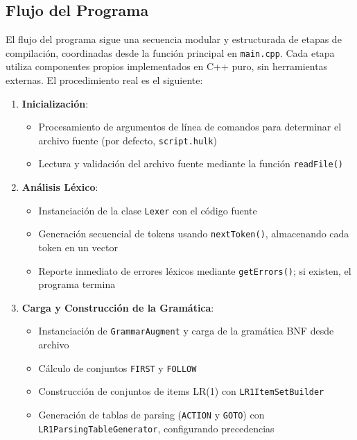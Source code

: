 \documentclass[11pt, a4paper, twoside]{article} %
\begin{document}
\subsection{Flujo del Programa}
El flujo del programa sigue una secuencia modular y estructurada de etapas de compilación, coordinadas desde la función principal en \texttt{main.cpp}. Cada etapa utiliza componentes propios implementados en C++ puro, sin herramientas externas. El procedimiento real es el siguiente:

\begin{enumerate}
    \item \textbf{Inicialización}:
    \begin{itemize}
        \item Procesamiento de argumentos de línea de comandos para determinar el archivo fuente (por defecto, \texttt{script.hulk})
        \item Lectura y validación del archivo fuente mediante la función \texttt{readFile()}
    \end{itemize}

    \item \textbf{Análisis Léxico}:
    \begin{itemize}
        \item Instanciación de la clase \texttt{Lexer} con el código fuente
        \item Generación secuencial de tokens usando \texttt{nextToken()}, almacenando cada token en un vector
        \item Reporte inmediato de errores léxicos mediante \texttt{getErrors()}; si existen, el programa termina
    \end{itemize}

    \item \textbf{Carga y Construcción de la Gramática}:
    \begin{itemize}
        \item Instanciación de \texttt{GrammarAugment} y carga de la gramática BNF desde archivo
        \item Cálculo de conjuntos \texttt{FIRST} y \texttt{FOLLOW}
        \item Construcción de conjuntos de items LR(1) con \texttt{LR1ItemSetBuilder}
        \item Generación de tablas de parsing (\texttt{ACTION} y \texttt{GOTO}) con \texttt{LR1ParsingTableGenerator}, configurando precedencias
    \end{itemize}


\end{enumerate}
\end{document}
